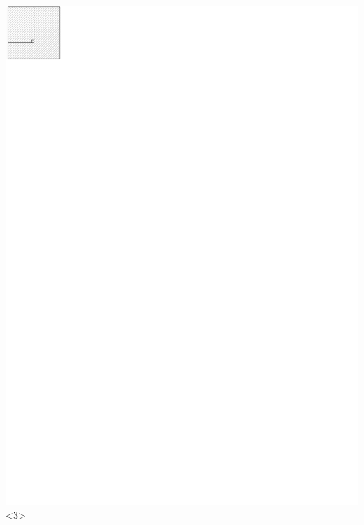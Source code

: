 \documentclass{beamer}
\begin{document}
\begin{frame}
\includegraphics[scale=1.5]{../img/walkingalg2.pdf}<3>

\end{frame}
\end{document}
